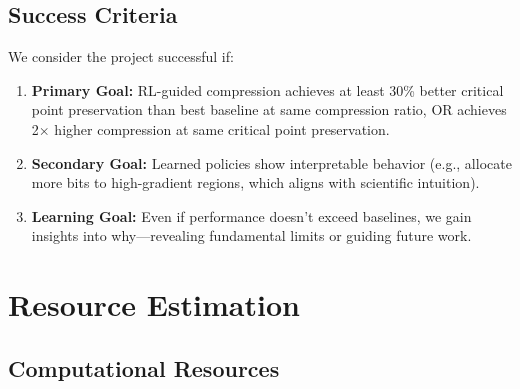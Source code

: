 \documentclass[11pt]{article}
\begin{document}
\subsection{Success Criteria}

We consider the project successful if:

\begin{enumerate}
    \item \textbf{Primary Goal:} RL-guided compression achieves at least 30\% better critical point preservation than best baseline at same compression ratio, OR achieves 2$\times$ higher compression at same critical point preservation.

    \item \textbf{Secondary Goal:} Learned policies show interpretable behavior (e.g., allocate more bits to high-gradient regions, which aligns with scientific intuition).

    \item \textbf{Learning Goal:} Even if performance doesn't exceed baselines, we gain insights into why—revealing fundamental limits or guiding future work.
\end{enumerate}

\section{Resource Estimation}

\subsection{Computational Resources}
\end{document}
